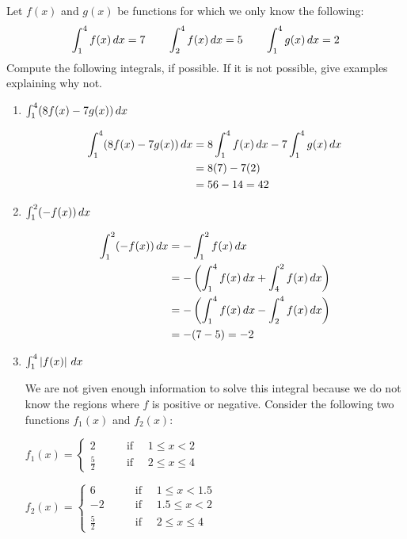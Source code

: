 \documentclass[handout,nooutcomes]{ximera}
\begin{document}
\begin{problem}
Let $f(x)$ and $g(x)$ be functions for which we only know the following:
$$ \int_1^4 f(x)\,d x = 7	\qquad	\int_2^4 f(x)\,d x = 5	\qquad	\int_1^4 g(x)\,d x = 2 $$
Compute the following integrals, if possible.  If it is not possible, give examples explaining why not.
	\begin{enumerate}
	
	\item  $\int_1^4 (8f(x) - 7g(x))\,d x $
		\begin{freeResponse}
			\begin{align*}
			\int_1^4 (8f(x) - 7g(x))\,d x &= 8 \int_1^4 f(x) \,d x - 7 \int_1^4 g(x) \,d x  \\
			&= 8(7) - 7(2) \\
			&= 56 - 14 = 42
			\end{align*}
		\end{freeResponse}
		
		
		
	\item  $\int_1^2 (-f(x)) \,d x $
		\begin{freeResponse}
			\begin{align*}
			\int_1^2 (-f(x)) \,d x &= - \int_1^2 f(x) \,d x  \\
			&= - \left( \int_1^4 f(x)\,d x + \int_4^2 f(x)\,d x \right)  \\
			&= - \left( \int_1^4 f(x)\,d x - \int_2^4 f(x)\,d x \right)  \\
			&= - (7 - 5) = -2
			\end{align*}
		\end{freeResponse}
		
		
		
	\item  $\int_1^4 \left| f(x) \right| \,d x$
		\begin{freeResponse}
		We are not given enough information to solve this integral because we do not know the regions where $f$ is positive or negative.
		Consider the following two functions $f_1(x)$ and $f_2(x)$:  
		
		$f_1(x) =   \left\{ \begin{array}{cl}
	2		 	&	\qquad \text{if } \quad 1 \leq x < 2					\\
	\frac{5}{2}		&	\qquad \text{if } \quad 2 \leq x \leq 4		\end{array} \right.  $
	
	$f_2(x) =   \left\{ \begin{array}{cl}
	6		 	&	\qquad \text{if } \quad 1 \leq x < 1.5					\\
	-2		 	&	\qquad \text{if } \quad 1.5 \leq x < 2					\\
	\frac{5}{2}		&	\qquad \text{if } \quad 2 \leq x \leq 4		\end{array} \right.  $
	

\end{freeResponse}
\end{enumerate}
\end{problem}
\end{document}
